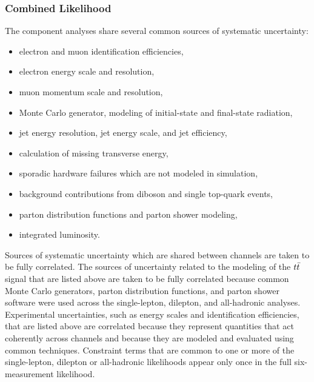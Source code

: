 \subsubsection{Combined Likelihood}
\label{sec:comb}

The component analyses share several common sources of systematic uncertainty:
\begin{itemize}
\item electron and muon identification efficiencies,
\item electron energy scale and resolution,
\item muon momentum scale and resolution,
\item Monte Carlo generator, modeling of initial-state and final-state radiation,
\item jet energy resolution, jet energy scale, and jet efficiency,
\item calculation of missing transverse energy,
\item sporadic hardware failures which are not modeled in simulation,
\item background contributions from diboson and single top-quark events,
\item parton distribution functions and parton shower modeling,
\item integrated luminosity.
\end{itemize}


Sources of systematic uncertainty which are shared between channels are taken to be fully correlated.
The sources of uncertainty related to the modeling of the $t\bar{t}$ signal that are listed above are taken to be fully correlated because common Monte Carlo generators, parton distribution functions, and parton shower software were used across the single-lepton, dilepton, and all-hadronic analyses.
Experimental uncertainties, such as energy scales and identification efficiencies, that are listed above are correlated because they represent quantities that act coherently across channels and because they are modeled and evaluated using common techniques.
Constraint terms that are common to one or more of the single-lepton, dilepton or all-hadronic likelihoods appear only once in the full six-measurement likelihood.

